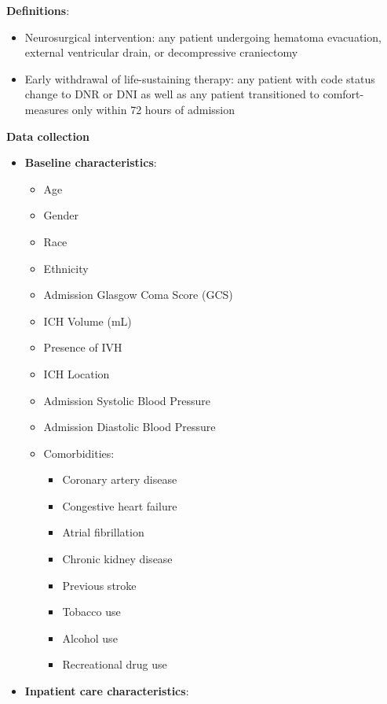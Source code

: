 \documentclass[
  letterpaper,
  DIV=11,
  numbers=noendperiod]{scrartcl}
\providecommand{\tightlist}{%
  \setlength{\itemsep}{0pt}\setlength{\parskip}{0pt}}\usepackage{longtable,booktabs,array}
\begin{document}
\textbf{Definitions}:

\begin{itemize}
\tightlist
\item
  Neurosurgical intervention: any patient undergoing hematoma
  evacuation, external ventricular drain, or decompressive craniectomy
\item
  Early withdrawal of life-sustaining therapy: any patient with code
  status change to DNR or DNI as well as any patient transitioned to
  comfort-measures only within 72 hours of admission
\end{itemize}

\textbf{Data collection}

\begin{itemize}
\item
  \textbf{Baseline characteristics}:

  \begin{itemize}
  \tightlist
  \item
    Age
  \item
    Gender
  \item
    Race
  \item
    Ethnicity
  \item
    Admission Glasgow Coma Score (GCS)
  \item
    ICH Volume (mL)
  \item
    Presence of IVH
  \item
    ICH Location
  \item
    Admission Systolic Blood Pressure
  \item
    Admission Diastolic Blood Pressure
  \item
    Comorbidities:

    \begin{itemize}
    \tightlist
    \item
      Coronary artery disease
    \item
      Congestive heart failure
    \item
      Atrial fibrillation
    \item
      Chronic kidney disease
    \item
      Previous stroke
    \item
      Tobacco use
    \item
      Alcohol use
    \item
      Recreational drug use
    \end{itemize}
  \end{itemize}
\item
  \textbf{Inpatient care characteristics}:


\end{itemize}
\end{document}
